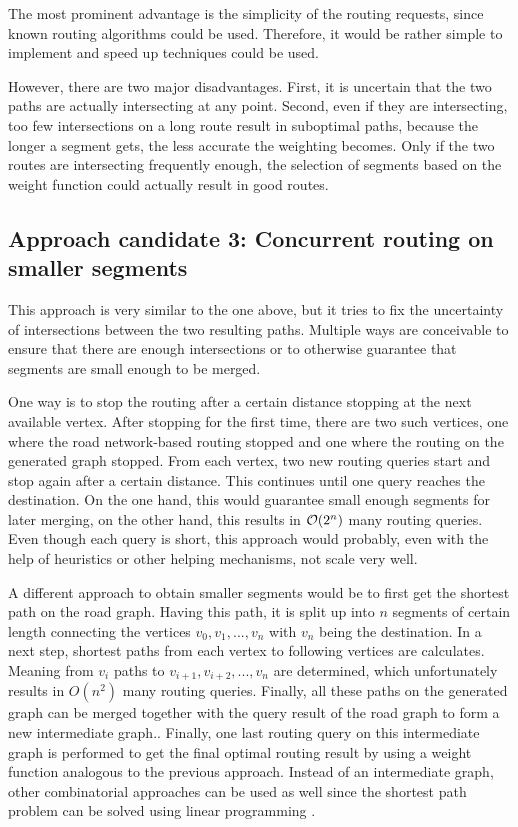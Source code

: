 		The most prominent advantage is the simplicity of the routing requests, since known routing algorithms could be used.
		Therefore, it would be rather simple to implement and speed up techniques could be used.
		
		However, there are two major disadvantages.
		First, it is uncertain that the two paths are actually intersecting at any point.
		Second, even if they are intersecting, too few intersections on a long route result in suboptimal paths, because the longer a segment gets, the less accurate the weighting becomes.
		Only if the two routes are intersecting frequently enough, the selection of segments based on the weight function could actually result in good routes.
	
	\subsection{Approach candidate 3: Concurrent routing on smaller segments}
	
		This approach is very similar to the one above, but it tries to fix the uncertainty of intersections between the two resulting paths.
		Multiple ways are conceivable to ensure that there are enough intersections or to otherwise guarantee that segments are small enough to be merged.
		
		One way is to stop the routing after a certain distance stopping at the next available vertex.
		After stopping for the first time, there are two such vertices, one where the road network-based routing stopped and one where the routing on the generated graph stopped.
		From each vertex, two new routing queries start and stop again after a certain distance.
		This continues until one query reaches the destination.
		On the one hand, this would guarantee small enough segments for later merging, on the other hand, this results in $\mathcal{O}(2^n)$ many routing queries.
		Even though each query is short, this approach would probably, even with the help of heuristics or other helping mechanisms, not scale very well.
		
		A different approach to obtain smaller segments would be to first get the shortest path on the road graph.
		Having this path, it is split up into $n$ segments of certain length connecting the vertices $v_0, v_1, ..., v_n$ with $v_n$ being the destination.
		In a next step, shortest paths from each vertex to following vertices are calculates.
		Meaning from $v_i$ paths to $v_{i+1}, v_{i+2}, ..., v_n$ are determined, which unfortunately results in $O(n^2)$ many routing queries.
		Finally, all these paths on the generated graph can be merged together with the query result of the road graph to form a new intermediate graph..
		Finally, one last routing query on this intermediate graph is performed to get the final optimal routing result by using a weight function analogous to the previous approach.
		Instead of an intermediate graph, other combinatorial approaches can be used as well since the shortest path problem can be solved using linear programming \cite{handler-zang-lp-duality}.
		
